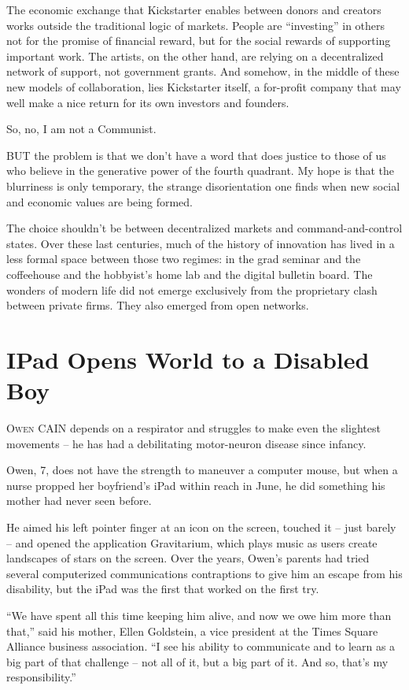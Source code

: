 ﻿\documentclass[12pt]{article}
\begin{document}
The economic exchange that Kickstarter enables between donors and creators works outside the
traditional logic of markets. People are ``investing'' in others not for the promise of financial
reward, but for the social rewards of supporting important work. The artists, on the other hand, are
relying on a decentralized network of support, not government grants. And somehow, in the middle of
these new models of collaboration, lies Kickstarter itself, a for-profit company that may well make
a nice return for its own investors and founders.

So, no, I am not a Communist.

BUT the problem is that we don't have a word that does justice to those of us who believe in the
generative power of the fourth quadrant. My hope is that the blurriness is only temporary, the
strange disorientation one finds when new social and economic values are being formed.

The choice shouldn't be between decentralized markets and command-and-control states. Over these
last centuries, much of the history of innovation has lived in a less formal space between those two
regimes: in the grad seminar and the coffeehouse and the hobbyist's home lab and the digital
bulletin board. The wonders of modern life did not emerge exclusively from the proprietary clash
between private firms. They also emerged from open networks.

\section{IPad Opens World to a Disabled Boy}

\lettrine{O}{wen} CAIN depends on a respirator and struggles to make even
the slightest movements -- he has had a debilitating motor-neuron disease since infancy.

Owen, 7, does not have the strength to maneuver a computer mouse, but when a nurse propped her
boyfriend's iPad within reach in June, he did something his mother had never seen before.

He aimed his left pointer finger at an icon on the screen, touched it -- just barely -- and opened
the application Gravitarium, which plays music as users create landscapes of stars on the screen.
Over the years, Owen's parents had tried several computerized communications contraptions to give
him an escape from his disability, but the iPad was the first that worked on the first try.

``We have spent all this time keeping him alive, and now we owe him more than that,'' said his
mother, Ellen Goldstein, a vice president at the Times Square Alliance business association. ``I see
his ability to communicate and to learn as a big part of that challenge -- not all of it, but a big
part of it. And so, that's my responsibility.''
\end{document}
